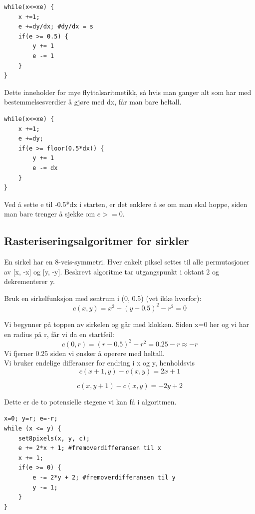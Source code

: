 \begin{lstlisting}
while(x<=xe) {
    x +=1;
    e +=dy/dx; #dy/dx = s
    if(e >= 0.5) {
        y += 1
        e -= 1
    }
}
\end{lstlisting}

Dette inneholder for mye flyttalsaritmetikk, så hvis man ganger alt som har med bestemmelsesverdier å gjøre med dx, får man bare heltall.

\begin{lstlisting}
while(x<=xe) {
    x +=1;
    e +=dy;
    if(e >= floor(0.5*dx)) {
        y += 1
        e -= dx
    }
}
\end{lstlisting}

Ved å sette e til -0.5*dx i starten, er det enklere å se om man skal hoppe, siden man bare trenger å sjekke om  $e>=0$.

\subsection{Rasteriseringsalgoritmer for sirkler}
En sirkel har en 8-veis-symmetri. Hver enkelt piksel settes til alle permutasjoner av [x, -x] og [y, -y]. Beskrevt algoritme tar utgangspunkt i oktant 2 og dekrementerer y.

Bruk en sirkelfunksjon med sentrum i (0, 0.5) (vet ikke hvorfor):
\begin{equation}
    c(x, y) = x^2 +(y-0.5)^2 - r^2 = 0
\end{equation}

Vi begynner på toppen av sirkelen og går med klokken. Siden x=0 her og vi har en radius på r, får vi da en startfeil:
\begin{equation}
    c(0, r) = (r - 0.5)^2 - r^2 = 0.25 - r \approx -r
\end{equation}
Vi fjerner 0.25 siden vi ønsker å operere med heltall. \\
Vi bruker endelige differanser for endring i x og y, henholdsvis
\begin{equation}
    c(x+1,y)-c(x,y) = 2x+1
\end{equation}

\begin{equation}
    c(x,y+1)-c(x,y) = -2y + 2
\end{equation}

Dette er de to potensielle stegene vi kan få i algoritmen.

\begin{lstlisting}
x=0; y=r; e=-r;
while (x <= y) {
    set8pixels(x, y, c);
    e += 2*x + 1; #fremoverdifferansen til x
    x += 1;
    if(e >= 0) {
        e -= 2*y + 2; #fremoverdifferansen til y
        y -= 1;
    }
}
\end{lstlisting}

